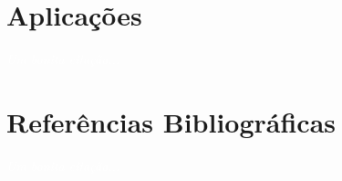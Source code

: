\documentclass[11pt,fleqn]{book} %
\begin{document}
\chapter{Aplicações}\label{aplicacoes}
\vspace{6em}
\begin{flushright}
	\textit{\textcolor{white}{Um bonita citação...}}
\end{flushright}
\vspace{12em}


%

\chapter*{Referências Bibliográficas}\label{referencias}
\vspace{6em}
\begin{flushright}
	\textit{\textcolor{white}{Um bonita citação...}}
\end{flushright}
\vspace{12em}
\printbibliography[heading=bibempty]
\end{document}
